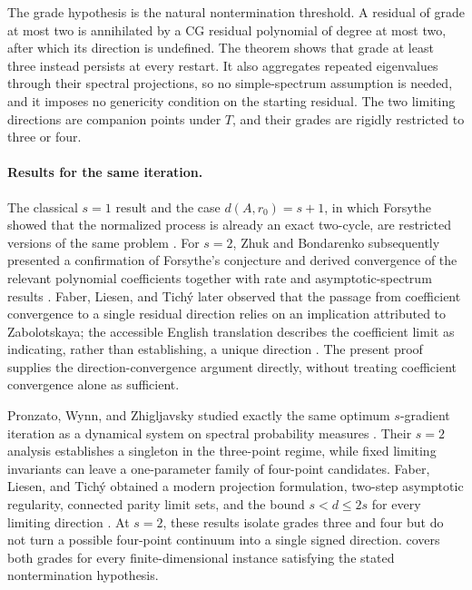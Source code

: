 \documentclass[11pt]{article}
\begin{document}
The grade hypothesis is the natural nontermination threshold.  A residual
of grade at most two is annihilated by a CG residual polynomial of degree
at most two, after which its direction is undefined.  The theorem shows
that grade at least three instead persists at every restart.  It also
aggregates repeated eigenvalues through their spectral projections, so no
simple-spectrum assumption is needed, and it imposes no genericity
condition on the starting residual.  The two limiting directions are
companion points under \(T\), and their grades are rigidly restricted to
three or four.

\paragraph{Results for the same iteration.}
The classical \(s=1\) result and the case
\(d(A,r_0)=s+1\), in which Forsythe showed that the normalized process is
already an exact two-cycle, are restricted versions of the same problem
\cite{Akaike1959,Forsythe1968}.  For \(s=2\), Zhuk and Bondarenko
subsequently presented a confirmation of Forsythe's conjecture and derived
convergence of the relevant polynomial coefficients together with rate and
asymptotic-spectrum results \cite{ZhukBondarenko1984}.  Faber, Liesen, and
Tich\'y later observed that the passage from coefficient convergence to a
single residual direction relies on an implication attributed to
Zabolotskaya; the accessible English translation describes the coefficient
limit as indicating, rather than establishing, a unique direction
\cite{Zabolotskaya1979,FaberLiesenTichy2023}.  The present proof supplies
the direction-convergence argument directly, without treating coefficient
convergence alone as sufficient.

Pronzato, Wynn, and Zhigljavsky studied exactly the same optimum
\(s\)-gradient iteration as a dynamical system on spectral probability
measures \cite{PronzatoWynnZhigljavsky2009}.  Their \(s=2\) analysis
establishes a singleton in the three-point regime, while fixed limiting
invariants can leave a one-parameter family of four-point candidates.
Faber, Liesen, and Tich\'y obtained a modern projection formulation,
two-step asymptotic regularity, connected parity limit sets, and the bound
\(s<d\leq2s\) for every limiting direction
\cite{FaberLiesenTichy2023}.  At \(s=2\), these results isolate grades three
and four but do not turn a possible four-point continuum into a single
signed direction.   covers both grades for every
finite-dimensional instance satisfying the stated nontermination
hypothesis.
\end{document}
